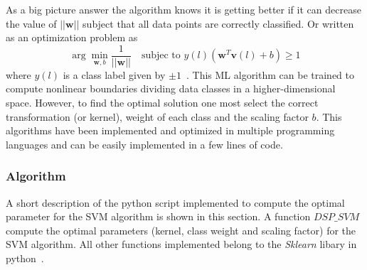 As a big picture answer the algorithm knows it is getting better if it can decrease the value of $||\textbf{w}||$ subject that all data points are correctly classified. Or written as an optimization problem as
\begin{equation}
\arg\min_{\textbf{w},b}\frac{1}{||\textbf{w}||} \ \ \  \text{   subjec to } y(l)(\textbf{w}^{T}\textbf{v}(l)+b)\geq1 
\end{equation}
where $y(l)$ is a class label given by $\pm 1$~\cite{boser1992training}. This ML algorithm can be trained to compute nonlinear boundaries dividing data classes in a higher-dimensional space. However, to find the optimal solution one most select the correct transformation (or kernel), weight of each class and the scaling factor $b$. This algorithms have been implemented and optimized in multiple programming languages and can be easily implemented in a few lines of code.
\subsubsection{Algorithm}

A short description of the python script implemented to compute the optimal parameter for the SVM  algorithm is shown in this section. A function $DSP\_SVM$ compute the optimal parameters (kernel, class weight and scaling factor) for the SVM algorithm. All other functions implemented belong to the \textit{Sklearn} libary in python~\cite{scikit-learn}.

